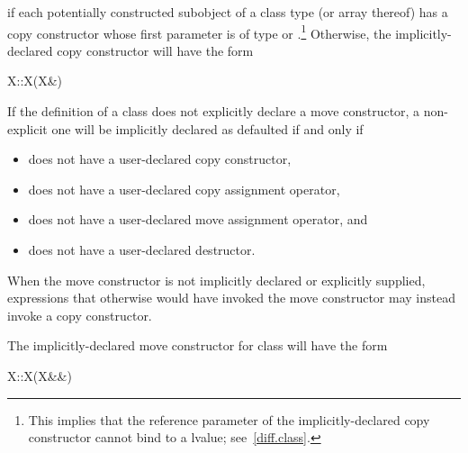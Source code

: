 if each potentially constructed subobject of a class type
(or array thereof)
has a copy constructor whose first parameter is of type
or
.\footnote{This implies that the reference parameter of the
implicitly-declared copy constructor
cannot bind to a
lvalue; see~\ref{diff.class}.}
Otherwise, the implicitly-declared copy constructor will have the form

\begin{codeblock}
X::X(X&)
\end{codeblock}

\pnum
{}%
If the definition of a class  does not explicitly declare
a move constructor, a non-explicit one will be
implicitly declared as defaulted if and only if

\begin{itemize}
\item
{} does not have a user-declared copy constructor,

\item
{} does not have a user-declared copy assignment operator,

\item
{} does not have a user-declared move assignment operator, and

\item
{} does not have a user-declared destructor.
\end{itemize}

\begin{note} When the move constructor is not implicitly declared or explicitly supplied,
expressions that otherwise would have invoked the move constructor may instead invoke
a copy constructor. \end{note}

\pnum
The implicitly-declared move constructor for class  will have the form
\begin{codeblock}
X::X(X&&)
\end{codeblock}

